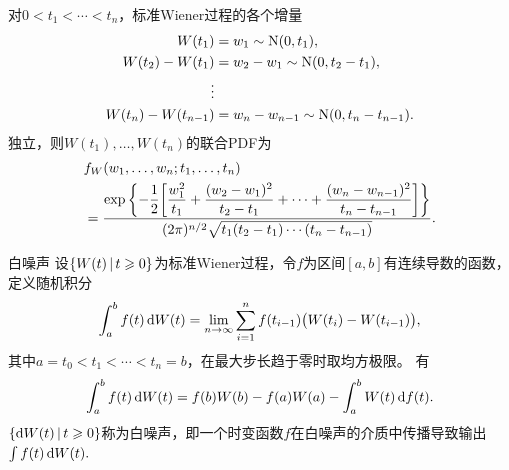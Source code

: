 对$0 < t_1 < \cdots < t_n$，标准Wiener过程的各个增量
\begin{align*}
	W(t_1) &= w_1 \sim \operatorname{N}(0,t_1),\\
	W(t_2) - W(t_1) &= w_2 - w_1 \sim \operatorname{N}(0,t_2 - t_1),\\
	\vdots\\
	W(t_n) - W(t_{n-1}) &= w_n - w_{n-1} \sim \operatorname{N}(0,t_n - t_{n-1}).
\end{align*}
独立，则$W(t_1),\ldots,W(t_n)$的联合PDF为 
\begin{equation}\label{eq:ps-wiener-joint-density}
    \begin{aligned}
		&f_W(w_1,\ldots,w_n;t_1,\ldots,t_n)\\
		&= \frac{\exp\bigg\{{-\dfrac12\biggl[\dfrac{w_1^2}{t_1} + \dfrac{(w_2 - w_1)^2}{t_2 - t_1} + \cdots + \dfrac{(w_n - w_{n-1})^2}{t_n - t_{n-1}}\biggr]\bigg\}}}{(2\pi)^{n/2}\sqrt{t_1(t_2 - t_1)\cdots(t_n - t_{n-1})}}.
    \end{aligned}
\end{equation}
\begin{example}{白噪声}{}
	设$\{W(t)\,\vert\,t \geqslant 0\}$为标准Wiener过程，令$f$为区间$[a,b]$有连续导数的函数，定义随机积分
	\begin{equation}\label{eq:ps-wiener-integral}
		\int_a^bf(t)\mathop{}\!\mathrm{d} W(t) = \lim_{n\to\infty}\sum_{i=1}^n f(t_{i-1})\bigl(W(t_i) - W(t_{i-1})\bigr),
	\end{equation}
	其中$a = t_0 < t_1 < \cdots < t_n = b$，在最大步长趋于零时取均方极限。%
	有
	\begin{equation}\label{eq:ps-wiener-integration-by-parts}
		\int_a^bf(t)\mathop{}\!\mathrm{d} W(t) = f(b)W(b) - f(a)W(a) - \int_a^bW(t)\mathop{}\!\mathrm{d} f(t).
	\end{equation}
	$\{\mathop{}\!\mathrm{d} W(t)\,\vert\,t \geqslant 0\}$称为白噪声，即一个时变函数$f$在白噪声的介质中传播导致输出$\textstyle\int f(t)\mathop{}\!\mathrm{d} W(t).$
\end{example}
